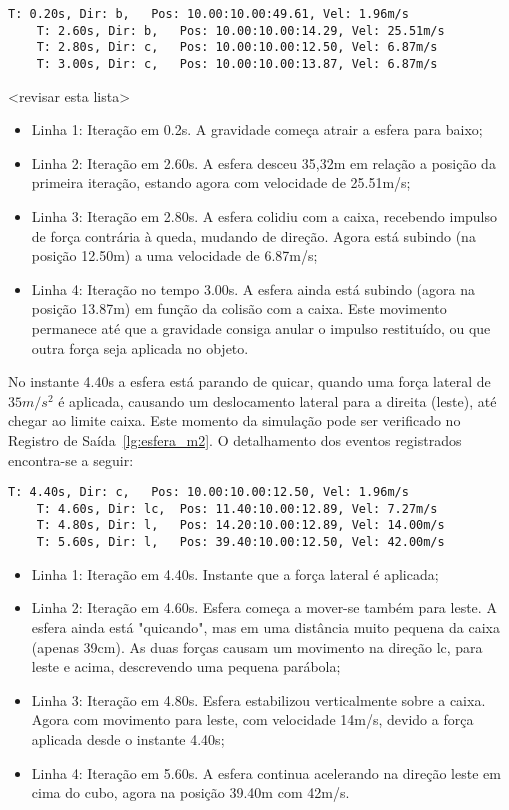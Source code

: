 \documentclass[12pt]{article}
\begin{document}
\begin{lstlisting}[frame=single,caption=Queda da esfera. \label{lg:esferaM1}]
	T: 0.20s, Dir: b, 	Pos: 10.00:10.00:49.61, Vel: 1.96m/s
	T: 2.60s, Dir: b, 	Pos: 10.00:10.00:14.29, Vel: 25.51m/s
	T: 2.80s, Dir: c, 	Pos: 10.00:10.00:12.50, Vel: 6.87m/s
	T: 3.00s, Dir: c, 	Pos: 10.00:10.00:13.87, Vel: 6.87m/s
\end{lstlisting}

<revisar esta lista> 
\begin{itemize}
	\item Linha 1: Iteração em 0.2s. A gravidade começa atrair a esfera para baixo;
	\item Linha 2: Iteração em 2.60s. A esfera desceu 35,32m em relação a posição da primeira iteração, estando agora com velocidade de 25.51m/s;
	\item Linha 3: Iteração em 2.80s. A esfera colidiu com a caixa, recebendo impulso de força contrária à queda, mudando de direção. Agora está subindo (na posição 12.50m) a uma velocidade de 6.87m/s; 
	\item Linha 4: Iteração no tempo 3.00s. A esfera ainda está subindo (agora na posição 13.87m) em função da colisão com a caixa. Este movimento permanece até que a gravidade consiga anular o impulso restituído, ou que outra força seja aplicada no objeto.
\end{itemize}

No instante 4.40s a esfera está parando de quicar, quando uma força lateral de $35m/s^{2}$ é aplicada, causando um deslocamento lateral para a direita (leste), até chegar ao limite caixa. Este momento da simulação pode ser verificado no Registro de Saída~\ref{lg:esfera_m2}. O detalhamento dos eventos registrados encontra-se a seguir:

\begin{lstlisting}[frame=single,caption=Esfera sobre a caixa. \label{lg:esfera_m2}]
	T: 4.40s, Dir: c, 	Pos: 10.00:10.00:12.50, Vel: 1.96m/s
	T: 4.60s, Dir: lc, 	Pos: 11.40:10.00:12.89, Vel: 7.27m/s
	T: 4.80s, Dir: l, 	Pos: 14.20:10.00:12.89, Vel: 14.00m/s
	T: 5.60s, Dir: l, 	Pos: 39.40:10.00:12.50, Vel: 42.00m/s
\end{lstlisting}

\begin{itemize}
	\item Linha 1: Iteração em 4.40s. Instante que a força lateral é aplicada;
	\item Linha 2: Iteração em 4.60s. Esfera começa a mover-se também para leste. A esfera ainda está "quicando", mas em uma distância muito pequena da caixa (apenas 39cm). As duas forças causam um movimento na direção lc, para leste e acima, descrevendo uma pequena parábola;
	\item Linha 3: Iteração em 4.80s. Esfera estabilizou verticalmente sobre a caixa. Agora com movimento para leste, com velocidade 14m/s, devido a força aplicada desde o instante 4.40s; 
	\item Linha 4: Iteração em 5.60s. A esfera continua acelerando na direção leste em cima do cubo, agora na posição 39.40m com 42m/s.
\end{itemize}
\end{document}
